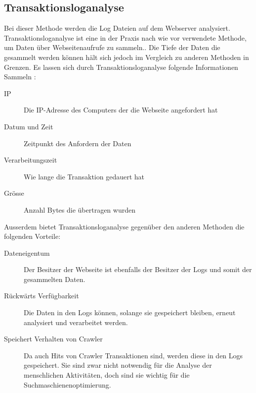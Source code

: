 

\subsection{Transaktionsloganalyse} 
Bei dieser Methode werden die Log Dateien auf dem Webserver analysiert. Transaktionsloganalyse ist eine in der Praxis nach wie vor verwendete Methode, um Daten über Webseitenaufrufe zu sammeln.\parencite[S. 173]{nakatani2011toolselectionmethod}. Die Tiefe der Daten die gesammelt werden können hält sich jedoch im Vergleich zu anderen Methoden in Grenzen. Es lassen sich durch Transaktionsloganalyse folgende Informationen Sammeln \parencite[S. 2]{waisberg2009webShort}:

\begin{description}
  \item[IP] Die IP-Adresse des Computers der die Webseite angefordert hat
  \item[Datum und Zeit] Zeitpunkt des Anfordern der Daten
  \item[Verarbeitungszeit] Wie lange die Transaktion gedauert hat
  \item[Grösse] Anzahl Bytes die übertragen wurden
\end{description}

Ausserdem bietet Transaktionsloganalyse gegenüber den anderen Methoden die folgenden Vorteile\parencite[S. 2]{waisberg2009webShort}:

\begin{description}
  \item[Dateneigentum] Der Besitzer der Webseite ist ebenfalls der Besitzer der Logs und somit der gesammelten Daten. 
  \item[Rückwärts Verfügbarkeit] Die Daten in den Logs können, solange sie gespeichert bleiben, erneut analysiert und verarbeitet werden. 
  \item[Speichert Verhalten von Crawler] Da auch Hits von Crawler Transaktionen sind, werden diese in den Logs gespeichert. Sie sind zwar nicht notwendig für die Analyse der menschlichen Aktivitäten, doch sind sie wichtig für die Suchmaschienenoptimierung\parencite[S. 174]{nakatani2011toolselectionmethod}. 
\end{description}


